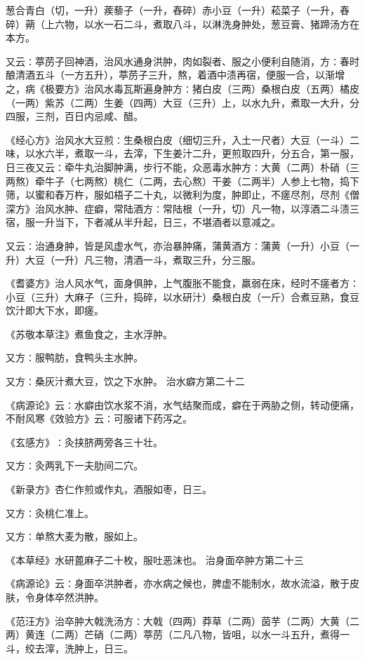 \documentclass[a4paper,12pt,UTF8,twoside]{ctexbook}
\begin{document}
葱合青白（切，一升）蒺藜子（一升，舂碎）赤小豆（一升）菘菜子（一升，舂碎）蒴（上六物，以水一石二斗，煮取八斗，以淋洗身肿处，葱豆膏、猪蹄汤方在本方。

又云∶葶苈子回神酒，治风水通身洪肿，肉如裂者、服之小便利自随消，方∶春时酿清酒五斗（一方五升），葶苈子三升，熬，着酒中渍再宿，便服一合，以渐增之，病《极要方》治风水毒瓦斯遍身肿方∶猪白皮（三两）桑根白皮（五两）橘皮（一两）紫苏（二两）生姜（四两）大豆（三升）上，以水九升，煮取一大升，分四服，三剂，百日内忌咸、醋。

《经心方》治风水大豆煎∶生桑根白皮（细切三升，入土一尺者）大豆（一斗）二味，以水六半，煮取一斗，去滓，下生姜汁二升，更煎取四升，分五合，第一服，日三夜又云∶牵牛丸治脚肿满，步行不能，众恶毒水肿方∶大黄（二两）朴硝（三两熬）牵牛子（七两熬）桃仁（二两，去心熬）干姜（二两半）人参上七物，捣下筛，以蜜和舂万杵，服如梧子二十丸，以微利为度，肿即止，不瘥尽剂，尽剂《僧深方》治风水肿、症癖，常陆酒方∶常陆根（一升，切）凡一物，以淳酒二斗渍三宿，服一升当下，下者减从半升起，日三，不堪酒者以意减之。

又云∶治通身肿，皆是风虚水气，亦治暴肿痛，蒲黄酒方∶蒲黄（一升）小豆（一升）大豆（一升）凡三物，清酒一斗，煮取三升，分三服。

《耆婆方》治人风水气，面身俱肿，上气腹胀不能食，羸弱在床，经时不瘥者方∶小豆（三升）大麻子（三升，捣碎，以水研汁）桑根白皮（一斤）合煮豆熟，食豆饮汁即大下水，即瘥。

《苏敬本草注》煮鱼食之，主水浮肿。

又方∶服鸭肪，食鸭头主水肿。

又方∶桑灰汁煮大豆，饮之下水肿。
治水癖方第二十二

《病源论》云∶水癖由饮水浆不消，水气结聚而成，癖在于两胁之侧，转动便痛，不耐风寒《效验方》云∶可服诸下药泻之。

《玄感方》∶灸挟脐两旁各三十壮。

又方∶灸两乳下一夫肋间二穴。

《新录方》杏仁作煎或作丸，酒服如枣，日三。

又方∶灸桃仁准上。

又方∶单熬大麦为散，服如上。

《本草经》水研蓖麻子二十枚，服吐恶沫也。
治身面卒肿方第二十三

《病源论》云∶身面卒洪肿者，亦水病之候也，脾虚不能制水，故水流溢，散于皮肤，令身体卒然洪肿。

《范汪方》治卒肿大戟洗汤方∶大戟（四两）莽草（二两）茵芋（二两）大黄（二两）黄连（二两）芒硝（二两）葶苈（二凡八物，皆咀，以水一斗五升，煮得一斗，绞去滓，洗肿上，日三。
\end{document}
